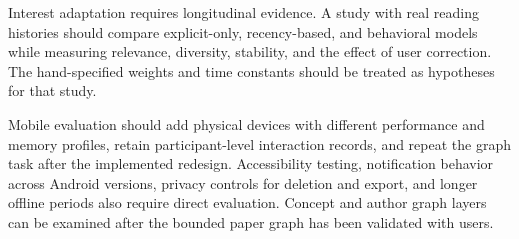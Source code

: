 Interest adaptation requires longitudinal evidence.
A study with real reading histories should compare explicit-only, recency-based, and behavioral models while measuring relevance, diversity, stability, and the effect of user correction.
The hand-specified weights and time constants should be treated as hypotheses for that study.

Mobile evaluation should add physical devices with different performance and memory profiles, retain participant-level interaction records, and repeat the graph task after the implemented redesign.
Accessibility testing, notification behavior across Android versions, privacy controls for deletion and export, and longer offline periods also require direct evaluation.
Concept and author graph layers can be examined after the bounded paper graph has been validated with users.

\clearpage
